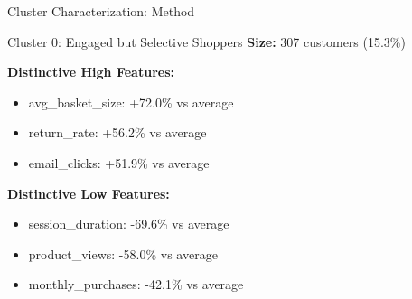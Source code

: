 \documentclass[aspectratio=169,ignorenonframetext]{beamer}
\begin{document}
\begin{frame}[fragile]{Cluster Characterization: Method}
\begin{Shaded}
\begin{Highlighting}[]
\OperatorTok{=}

 
\OperatorTok{=}

\OperatorTok{=}\NormalTok{ (}
\OperatorTok{{-}}\OperatorTok{/}
\OperatorTok{*} 
\NormalTok{    )}

\OperatorTok{=}\NormalTok{)}
\OperatorTok{=}\NormalTok{)}
\end{Highlighting}
\end{Shaded}
\end{frame}

\begin{frame}{Cluster 0: Engaged but Selective Shoppers}
\textbf{Size:} 307 customers (15.3\%)

\textbf{Distinctive High Features:}

\begin{itemize}
\item
  avg\_basket\_size: +72.0\% vs average
\item
  return\_rate: +56.2\% vs average
\item
  email\_clicks: +51.9\% vs average
\end{itemize}

\textbf{Distinctive Low Features:}

\begin{itemize}
\item
  session\_duration: -69.6\% vs average
\item
  product\_views: -58.0\% vs average
\item
  monthly\_purchases: -42.1\% vs average
\end{itemize}
\end{frame}
\end{document}

